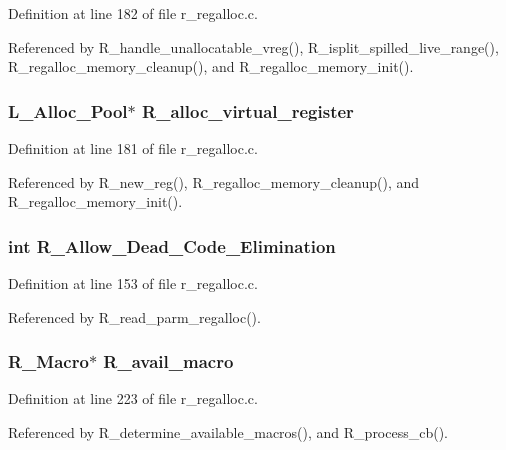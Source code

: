Definition at line 182 of file r\_\-regalloc.c.

Referenced by R\_\-handle\_\-unallocatable\_\-vreg(), R\_\-isplit\_\-spilled\_\-live\_\-range(), R\_\-regalloc\_\-memory\_\-cleanup(), and R\_\-regalloc\_\-memory\_\-init().
\subsubsection{\setlength{\rightskip}{0pt plus 5cm}\bf{L\_\-Alloc\_\-Pool}$\ast$ \bf{R\_\-alloc\_\-virtual\_\-register}}\label{r__regalloc_8h_d9c135d9e98c611483eaf0d10a395047}




Definition at line 181 of file r\_\-regalloc.c.

Referenced by R\_\-new\_\-reg(), R\_\-regalloc\_\-memory\_\-cleanup(), and R\_\-regalloc\_\-memory\_\-init().
\subsubsection{\setlength{\rightskip}{0pt plus 5cm}int \bf{R\_\-Allow\_\-Dead\_\-Code\_\-Elimination}}\label{r__regalloc_8h_4a883ab92852b2a86d44ca35e6376774}




Definition at line 153 of file r\_\-regalloc.c.

Referenced by R\_\-read\_\-parm\_\-regalloc().
\subsubsection{\setlength{\rightskip}{0pt plus 5cm}\bf{R\_\-Macro}$\ast$ \bf{R\_\-avail\_\-macro}}\label{r__regalloc_8h_c02ed243a1595ec434dce74e462980e7}




Definition at line 223 of file r\_\-regalloc.c.

Referenced by R\_\-determine\_\-available\_\-macros(), and R\_\-process\_\-cb().
